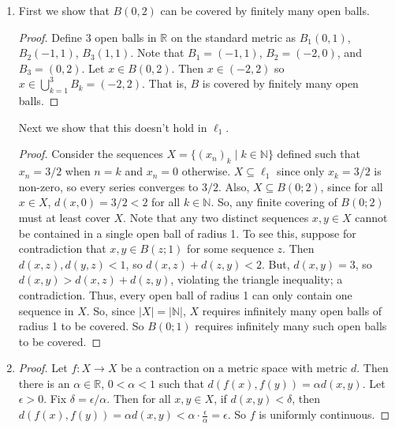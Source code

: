 \documentclass[11pt, letterpaper]{article}
\begin{document}
\thispagestyle{firststyle}


\begin{enumerate}
  \item First we show that $B(0, 2)$ can be covered by finitely many open balls.
  \begin{proof}
    Define 3 open balls in $\mathbb R$ on the standard metric as $B_1(0, 1)$, $B_2(-1, 1)$, $B_3(1, 1)$. Note that $B_1 = (-1, 1)$, $B_2 = (-2, 0)$, and $B_3 = (0, 2)$. Let $x \in B(0, 2)$. Then $x \in (-2, 2)$ so $x \in \bigcup_{k =1}^3 B_k = (-2, 2)$. That is, $B$ is covered by finitely many open balls.
  \end{proof}

  Next we show that this doesn't hold in $\ell_1$.
  \begin{proof}
    Consider the sequences $X = \lbrace (x_n)_k \mid k \in \mathbb N \rbrace$ defined such that $x_n = 3/2$ when $n = k$ and $x_n = 0$ otherwise. $X \subseteq \ell_1$ since only $x_k = 3/2$ is non-zero, so every series converges to $3/2$. Also, $X \subseteq B(0; 2)$, since for all $x \in X$, $d(x, 0) = 3/2 < 2$ for all $k \in \mathbb N$. So, any finite covering of $B(0; 2)$ must at least cover $X$. Note that any two distinct sequences $x, y \in X$ cannot be contained in a single open ball of radius 1. To see this, suppose for contradiction that $x, y \in B(z; 1)$ for some sequence $z$. Then $d(x, z), d(y, z) < 1$, so $d(x, z) + d(z, y) < 2$. But, $d(x, y) = 3$, so $d(x, y) > d(x, z) + d(z, y)$, violating the triangle inequality; a contradiction. Thus, every open ball of radius 1 can only contain one sequence in $X$. So, since $\vert X \vert = \vert \mathbb N \vert$, $X$ requires infinitely many open balls of radius 1 to be covered. So $B(0; 1)$ requires infinitely many such open balls to be covered.
  \end{proof}

  \item \begin{proof}
    Let $f: X \to X$ be a contraction on a metric space with metric $d$. Then there is an $\alpha \in \mathbb R$, $0 < \alpha < 1$ such that $d(f(x), f(y)) = \alpha d(x, y)$. Let $\epsilon > 0$. Fix $\delta = \epsilon/\alpha$. Then for all $x, y \in X$, if $d(x, y) < \delta$, then $d(f(x), f(y)) = \alpha d(x, y) < \alpha \cdot \frac{\epsilon}{\alpha} = \epsilon$. So $f$ is uniformly continuous.
  \end{proof}
\end{enumerate}
\end{document}
